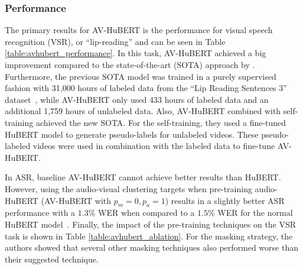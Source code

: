 \subsubsection{Performance}
The primary results for AV-HuBERT is the performance for visual speech recognition (VSR), or ``lip-reading'' and can be seen in Table \ref{table:avhubert_performance}. In this task, AV-HuBERT achieved a big improvement compared to the state-of-the-art (SOTA) approach by \citealt{makino-etal-2021-neural}. Furthermore, the previous SOTA model was trained in a purely supervised fashion with 31,000 hours of labeled data from the ``Lip Reading Sentences 3'' dataset~\cite{afouras2018lrs3ted}, while AV-HuBERT only used 433 hours of labeled data and an additional 1,759 hours of unlabeled data. Also, AV-HuBERT combined with self-training achieved the new SOTA. For the self-training, they used a fine-tuned HuBERT model to generate pseudo-labels for unlabeled videos. These pseudo-labeled videos were used in combination with the labeled data to fine-tune AV-HuBERT.

\begin{table}[htbp]
    \caption{\label{table:avhubert_performance}Visual Speech Recognition (VSR, ``Lip-Reading'') Performance (Excerpt from \cite{AV_HuBERT}). Conformer: Convolution-Augmented Transformer, ST: Self-Training.}
\end{table}

In ASR, baseline AV-HuBERT cannot achieve better results than HuBERT. However, using the audio-visual clustering targets when pre-training audio-HuBERT (AV-HuBERT with $p_m=0,p_a=1$) results in a slightly better ASR performance with a $1.3\%$ WER when compared to a $1.5\%$ WER for the normal HuBERT model~\cite{AV_HuBERT}.
Finally, the impact of the pre-training techniques on the VSR task is shown in Table \ref{table:avhubert_ablation}. For the masking strategy, the authors showed that several other masking techniques also performed worse than their suggested technique.


